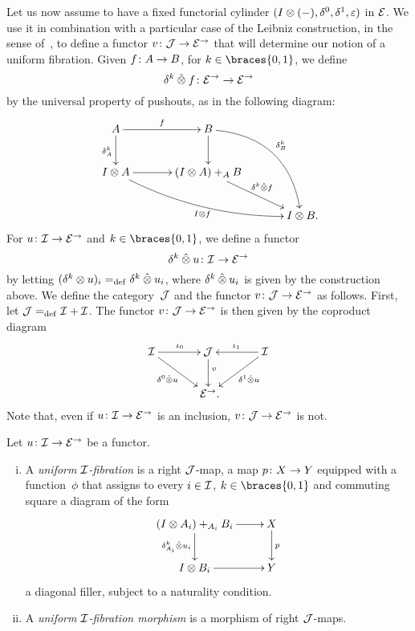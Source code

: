 \documentclass[reqno,10pt,a4paper,oneside,draft]{amsart}
\begin{document}
Let us now assume to have a fixed  functorial cylinder $(\interval \otimes (-), \lcyl, \rcyl, \ccyl)$ in $\calE$.
We use it in combination with a particular case of the Leibniz construction, in the sense of~\cite{riehl-verity:reedy}, to define a functor $v \co \cal{J} \to \catE^\to$ that will determine our notion of a uniform fibration.
Given $f \co A \to B$, for $k \in \braces{0, 1}$, we define
\[
  \delta^k \hatotimes f \co \catE^\to \to \catE^\to
\]
by the universal property of pushouts, as in the following diagram:
\begin{gather*}
\xymatrix@C=1.2cm{
  A \ar[r]^{f} \ar[d]_{\kcyl_{A}} & B \ar@/^2pc/[ddr]^{\kcyl_{B}} \ar[d] & \\
  \interval \otimes A \ar@/_1pc/[drr]_{\interval \otimes f} \ar[r] & (\interval \otimes A) +_{A} B \ar[dr]^-{\delta^k \hatotimes f} & \\
  & & \interval \otimes B
\rlap{.}}
\end{gather*}
For $u \co \cal{I} \to \catE^\to$ and $k \in \braces{0, 1}$, we define a functor
\[
  \kcyl \hatotimes u \co \cal{I} \to \catE^\to
\]
by letting $(\kcyl \otimes u)_i \defeq \kcyl \hatotimes u_i$, where $\kcyl \hatotimes u_i$ is given by the construction above.
We define the category~$\cal{J}$ and the functor $v \co \cal{J} \to \catE^\to$ as follows.
First, let $\cal{J} \defeq \cal{I} + \cal{I}$.
The functor $v \co \cal{J} \to \catE^\to$ is then given by the coproduct diagram
\begin{equation*}
\xymatrix@C=1.2cm{
  \cal{I} \ar[r]^{\iota_0} \ar[dr]_-{\lcyl \hatotimes u} & \cal{J} \ar[d]^(.4){v} & \cal{I} \ar[dl]^-{\rcyl \hatotimes u} \ar[l]_{\iota_1} \\
  & \catE^\to
\rlap{.}}
\end{equation*}
Note that, even if $u \co \cal{I} \to \catE^\to$ is an inclusion, $v \co \cal{J} \to \catE^\to$ is not.

\begin{definition} \label{def:I-fibration}
Let $u \co \cal{I} \to \catE^\to$ be a functor.
\begin{enumerate}[(i)]
\item A \emph{uniform $\cal{I}$-fibration} is a right $\cal{J}$-map, \ie a map $p \co X \to Y$ equipped with a function~$\phi$ that assigns to every $i \in \cal{I}$, $k \in \braces{0, 1}$ and commuting square a diagram of the form
\[
\xymatrix{
  (\interval \otimes A_i) +_{A_i} B_i \ar[r] \ar[d]_{\kcyl_{A_i} \hatotimes u_i} & X \ar[d]^p \\
  \interval \otimes B_i \ar[r] & Y
}
\]
a diagonal filler, subject to a naturality condition.
\item A \emph{uniform $\cal{I}$-fibration morphism} is a morphism of right $\cal{J}$-maps.
\end{enumerate}
\end{definition}
\end{document}
